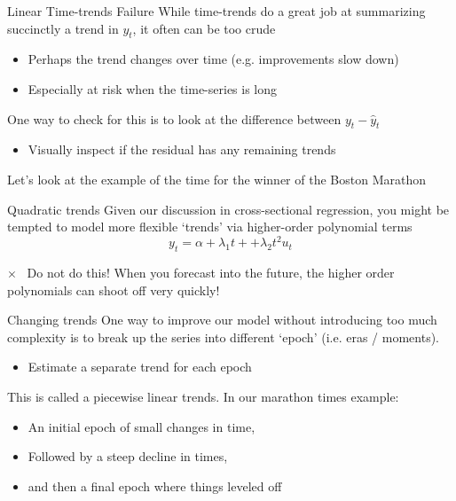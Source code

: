 \documentclass[aspectratio=169,t,11pt,table]{beamer}
\begin{document}
\begin{frame}{Linear Time-trends Failure}
  While time-trends do a great job at summarizing succinctly a trend in $y_t$, it often can be too crude

  \begin{itemize}
    \item Perhaps the trend changes over time (e.g. improvements slow down)
    
    \item Especially at risk when the time-series is long
  \end{itemize}

  \bigskip
  One way to check for this is to look at the difference between $y_t - \hat{y}_t$
  \begin{itemize}
    \item Visually inspect if the residual has any remaining trends
  \end{itemize}

  \bigskip
  Let's look at the example of the time for the winner of the Boston Marathon
\end{frame}


\begin{frame}{Quadratic trends}
  Given our discussion in cross-sectional regression, you might be tempted to model more flexible `trends' via higher-order polynomial terms
  $$
    y_t = \alpha + \lambda_1 t + + \lambda_2 t^2 u_t
  $$

  \bigskip
  \begin{tcolorbox}[boxrule = 0pt, frame hidden, sharp corners, enhanced, borderline west = {4pt}{0pt}{red}, interior hidden]
    {\color{red}\Large $\times$\ } Do not do this! When you forecast into the future, the higher order polynomials can shoot off very quickly! 
  \end{tcolorbox}
\end{frame}

\begin{frame}{Changing trends}
  One way to improve our model without introducing too much complexity is to break up the series into different `epoch' (i.e. eras / moments). 
  \begin{itemize}
    \item Estimate a separate trend for each epoch
  \end{itemize}

  \bigskip
  This is called a \alert{piecewise linear trends}. 
  In our marathon times example:
  \begin{itemize}
    \item An initial epoch of small changes in time,
    \item Followed by a steep decline in times, 
    \item and then a final epoch where things leveled off
  \end{itemize}
\end{frame}
\end{document}
